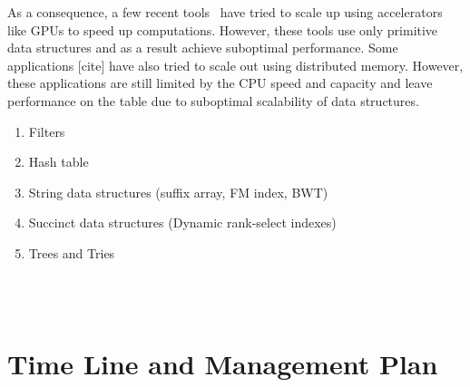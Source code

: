 As a consequence, a few recent tools~\cite{cite-something} have tried to scale
up using accelerators like GPUs to speed up computations. However, these tools
use only primitive data structures and as a result achieve suboptimal
performance. Some applications [cite] have also tried to scale out using
distributed memory.  However, these applications are still limited by the CPU
speed and capacity and leave performance on the table due to suboptimal
scalability of data structures.




\begin{enumerate}[noitemsep, leftmargin=*]
  \item Filters
  \item Hash table
  \item String data structures (suffix array, FM index, BWT)
  \item Succinct data structures (Dynamic rank-select indexes)
  \item Trees and Tries
\end{enumerate}



\\
\\


\section{Time Line and Management Plan}

